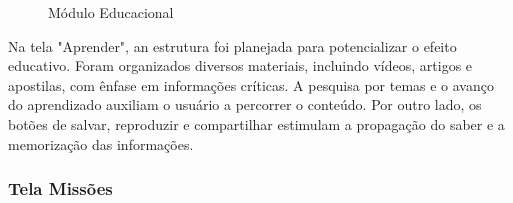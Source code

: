 \documentclass[a4paper, 12pt]{article}
\begin{document}
\begin{figure}[H]
  \centering
  \caption{Módulo Educacional}
  \label{fig:educacao}
\end{figure}

Na tela "Aprender", an estrutura foi planejada para potencializar o efeito educativo.  Foram organizados diversos materiais, incluindo vídeos, artigos e apostilas, com ênfase em informações críticas.  A pesquisa por temas e o avanço do aprendizado auxiliam o usuário a percorrer o conteúdo. Por outro lado, os botões de salvar, reproduzir e compartilhar estimulam a propagação do saber e a memorização das informações.

\subsubsection{Tela Missões}
\end{document}
